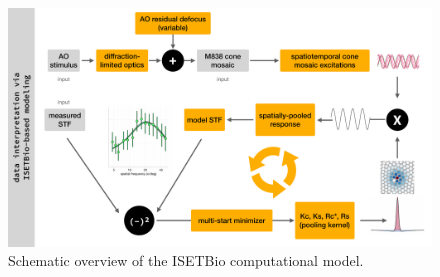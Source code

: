\documentclass[11pt, oneside]{article}   	%
\begin{document}
\begin{figure}[htbp] %
   \centering
   \includegraphics[width=7in]{Figures/ModelOverview.pdf} 
   \caption{Schematic overview of the ISETBio computational model.}
   \label{fig:ModelOverview}
\end{figure}
\end{document}
